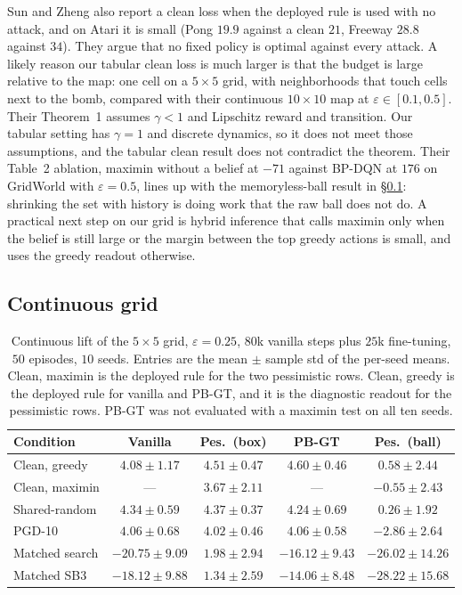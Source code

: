 \documentclass[10pt,twocolumn]{article}
\begin{document}
Sun and Zheng also report a clean loss when the deployed rule is used with no attack, and on Atari it is small (Pong $19.9$ against a clean $21$, Freeway $28.8$ against $34$).
They argue that no fixed policy is optimal against every attack.
A likely reason our tabular clean loss is much larger is that the budget is large relative to the map: one cell on a $5{\times}5$ grid, with neighborhoods that touch cells next to the bomb, compared with their continuous $10{\times}10$ map at $\varepsilon\in[0.1,0.5]$.
Their Theorem~1 assumes $\gamma<1$ and Lipschitz reward and transition.
Our tabular setting has $\gamma=1$ and discrete dynamics, so it does not meet those assumptions, and the tabular clean result does not contradict the theorem.
Their Table~2 ablation, maximin without a belief at $-71$ against BP-DQN at $176$ on GridWorld with $\varepsilon=0.5$, lines up with the memoryless-ball result in \S\ref{sec:cgw}: shrinking the set with history is doing work that the raw ball does not do.
A practical next step on our grid is hybrid inference that calls maximin only when the belief is still large or the margin between the top greedy actions is small, and uses the greedy readout otherwise.

\subsection{Continuous grid}
\label{sec:cgw}

\begin{table}[t]
\centering
\small
\caption{Continuous lift of the $5{\times}5$ grid, $\varepsilon{=}0.25$, $80$k vanilla steps plus $25$k fine-tuning, $50$ episodes, $10$ seeds.
Entries are the mean $\pm$ sample std of the per-seed means.
Clean, maximin is the deployed rule for the two pessimistic rows.
Clean, greedy is the deployed rule for vanilla and PB-GT, and it is the diagnostic readout for the pessimistic rows.
PB-GT was not evaluated with a maximin test on all ten seeds.}
\label{tab:cgw}
\setlength{\tabcolsep}{4pt}
\begin{tabular}{@{}lcccc@{}}
\toprule
Condition & Vanilla & Pes.\ (box) & PB-GT & Pes.\ (ball) \\
\midrule
Clean, greedy & $4.08{\pm}1.17$ & $4.51{\pm}0.47$ & $4.60{\pm}0.46$ & $0.58{\pm}2.44$ \\
Clean, maximin & --- & $3.67{\pm}2.11$ & --- & $-0.55{\pm}2.43$ \\
Shared-random & $4.34{\pm}0.59$ & $4.37{\pm}0.37$ & $4.24{\pm}0.69$ & $0.26{\pm}1.92$ \\
PGD-10 & $4.06{\pm}0.68$ & $4.02{\pm}0.46$ & $4.06{\pm}0.58$ & $-2.86{\pm}2.64$ \\
Matched search & $-20.75{\pm}9.09$ & $1.98{\pm}2.94$ & $-16.12{\pm}9.43$ & $-26.02{\pm}14.26$ \\
Matched SB3 & $-18.12{\pm}9.88$ & $1.34{\pm}2.59$ & $-14.06{\pm}8.48$ & $-28.22{\pm}15.68$ \\
\bottomrule
\end{tabular}
\end{table}
\end{document}
